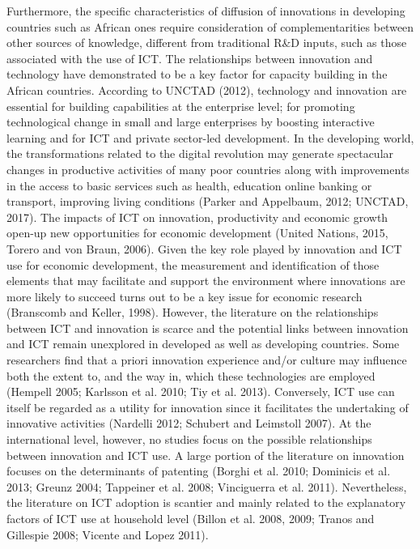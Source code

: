 \documentclass[11pt]{article}
\begin{document}
{Furthermore, the specific characteristics of diffusion of innovations in developing countries such as African ones require consideration of complementarities between other sources of knowledge, different from traditional R\&D inputs, such as those associated with the use of ICT. The relationships between innovation and technology have demonstrated to be a key factor for capacity building in the African countries. According to UNCTAD (2012), technology and innovation are essential for building capabilities at the enterprise level; for promoting technological change in small and large enterprises by boosting interactive learning and for ICT and private sector-led development. In the developing world, the transformations related to the digital revolution may generate spectacular changes in productive activities of many poor countries along with improvements in the access to basic services such as health, education online banking or transport, improving living conditions (Parker and Appelbaum, 2012; UNCTAD, 2017). The impacts of ICT on innovation, productivity and economic growth open-up new opportunities for economic development (United Nations, 2015, Torero and von Braun, 2006). Given the key role played by innovation and ICT use for economic development, the measurement and identification of those elements that may facilitate and support the environment where innovations are more likely to succeed turns out to be a key issue for economic research (Branscomb and Keller, 1998). However, the literature on the relationships between ICT and innovation is scarce and the potential links between innovation and ICT remain unexplored in developed as well as developing countries. Some researchers find that a priori innovation experience and/or culture may influence both the extent to, and the way in, which these technologies are employed (Hempell 2005; Karlsson et al. 2010; Tiy et al. 2013). Conversely, ICT use can itself be regarded as a utility for innovation since it facilitates the undertaking of innovative activities (Nardelli 2012; Schubert and Leimstoll 2007). At the international level, however, no studies focus on the possible relationships between innovation and ICT use. A large portion of the literature on innovation focuses on the determinants of patenting (Borghi et al. 2010; Dominicis et al. 2013; Greunz 2004; Tappeiner et al. 2008; Vinciguerra et al. 2011). Nevertheless, the literature on ICT adoption is scantier and mainly related to the explanatory factors of ICT use at household level (Billon et al. 2008, 2009; Tranos and Gillespie 2008; Vicente and Lopez 2011). 

}
\end{document}
